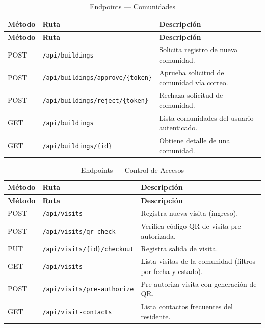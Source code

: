 \begin{longtable}{|p{}|p{}|p{}|}
\caption{Endpoints --- Comunidades}\label{tab:ep-communities}\\
\hline
\textbf{Método} & \textbf{Ruta} & \textbf{Descripción} \\
\hline
\endfirsthead
\hline \textbf{Método} & \textbf{Ruta} & \textbf{Descripción} \\ \hline
\endhead
\hline \endfoot

POST & \texttt{/api/buildings} & Solicita registro de nueva comunidad. \\
\hline
POST & \texttt{/api/buildings/approve/\{token\}} & Aprueba solicitud de comunidad vía correo. \\
\hline
POST & \texttt{/api/buildings/reject/\{token\}} & Rechaza solicitud de comunidad. \\
\hline
GET & \texttt{/api/buildings} & Lista comunidades del usuario autenticado. \\
\hline
GET & \texttt{/api/buildings/\{id\}} & Obtiene detalle de una comunidad. \\

\end{longtable}

\begin{longtable}{|p{}|p{}|p{}|}
\caption{Endpoints --- Control de Accesos}\label{tab:ep-access}\\
\hline
\textbf{Método} & \textbf{Ruta} & \textbf{Descripción} \\
\hline
\endfirsthead
\hline \textbf{Método} & \textbf{Ruta} & \textbf{Descripción} \\ \hline
\endhead
\hline \endfoot

POST & \texttt{/api/visits} & Registra nueva visita (ingreso). \\
\hline
POST & \texttt{/api/visits/qr-check} & Verifica código QR de visita pre-autorizada. \\
\hline
PUT & \texttt{/api/visits/\{id\}/checkout} & Registra salida de visita. \\
\hline
GET & \texttt{/api/visits} & Lista visitas de la comunidad (filtros por fecha y estado). \\
\hline
POST & \texttt{/api/visits/pre-authorize} & Pre-autoriza visita con generación de QR. \\
\hline
GET & \texttt{/api/visit-contacts} & Lista contactos frecuentes del residente. \\

\end{longtable}

